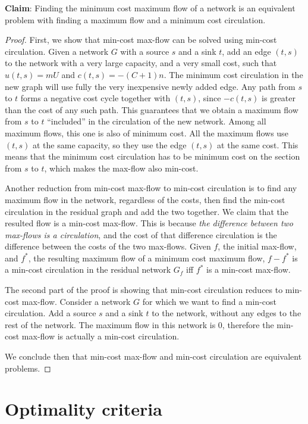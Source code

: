 \documentclass{article}
\begin{document}
\textbf{Claim}:
Finding the minimum cost maximum flow of a network is an equivalent problem with finding a maximum flow and a minimum cost circulation.

\begin{proof}
First, we show that min-cost max-flow can be solved using min-cost circulation. Given a network $G$ with a source $s$ and a sink $t$, add an edge $(t, s)$to the network  with a very large capacity, and a very small cost, such that $u(t, s) = mU$ and $c(t, s) = -(C+1)n$. The minimum cost circulation in the new graph will use fully the very inexpensive newly added edge. Any path from $s$ to $t$ forms a negative cost cycle together with $(t, s)$, since $-c(t, s)$ is greater than the cost of any such path. This guarantees that we obtain a maximum flow from $s$ to $t$ ``included'' in the circulation of the new network. Among all maximum flows, this one is also of minimum cost. All the maximum flows use $(t, s)$ at the same capacity, so they use the edge $(t, s)$ at the same cost. This means that the minimum cost circulation has to be minimum cost on the section from $s$ to $t$, which makes the max-flow also min-cost.  

Another reduction from min-cost max-flow to min-cost circulation is to find any maximum flow in the network, regardless of the costs, then find the min-cost circulation in the residual graph and add the two together. We claim that the resulted flow is a min-cost max-flow. This is because \emph{the difference between two max-flows is a circulation}, and the cost of that difference circulation is the difference between the costs of the two max-flows. Given $f$, the initial max-flow, and $f^*$, the resulting maximum flow of a minimum cost maximum flow, $f-f^*$ is a min-cost circulation in the residual network $G_f$ iff $f^*$ is a min-cost max-flow. 

The second part of the proof is showing that min-cost circulation reduces to min-cost max-flow. Consider a network $G$ for which we want to find a min-cost circulation. Add a source $s$ and a sink $t$ to the network, without any edges to the rest of the network. The maximum flow in this network is 0, therefore the min-cost max-flow is actually a min-cost circulation. 

We conclude then that min-cost max-flow and min-cost circulation are equivalent problems. 
\end{proof}

\section{Optimality criteria}
\end{document}
